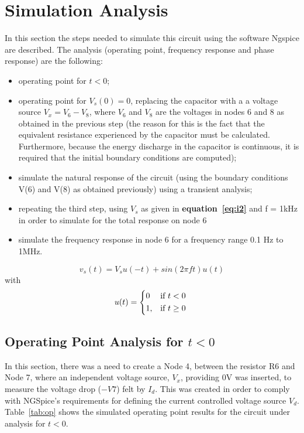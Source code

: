 \section{Simulation Analysis}
\label{sec:simulation}
In this section the steps needed to simulate this circuit using the software Ngspice are described. The analysis (operating point, frequency response and phase response) are the following:
\begin{itemize} 
	\item operating point for $t<0$;
	\item operating point for  $V_s(0) = 0$, replacing the capacitor with a a voltage source $V_x = V_6 - V_8$, where $V_6$ and $V_8$ are the voltages in nodes 6 and 8 as obtained in the previous step (the reason for this is the fact that the equivalent resistance experienced by the capacitor must be calculated. Furthermore, because the energy discharge in the capacitor is continuous, it is required that the initial boundary conditions are computed);
	\item simulate the natural response of the circuit (using the boundary conditions V(6) and V(8) as obtained previously) using a transient analysis;
	\item repeating the third step, using {\it $V_s$} as given in \textbf{equation~\ref{eq:i2}} and f = 1kHz  in order to simulate for the total response on node 6
	\item simulate the frequency response in node 6 for a frequency range 0.1 Hz to 1MHz.
\end{itemize}
\begin {equation}
	v_s( t)  = V_s u(-t) + sin( 2 \pi f t ) u( t)
	\label{eq:i1}
\end{equation}
 with 
\begin {equation}
	u( t ) =  
	\begin{cases*} 
	  0 & if $t < 0$ \\
	1, & if $t \geq 0$
	\end{cases*}
	\label{eq:i31}  
\end{equation}

\subsection{Operating Point Analysis for $t<0$}
In this section, there was a need to create a Node 4, between the resistor R6 and Node 7, where an independent voltage source, $V_x$, providing 0V was inserted, to measure the voltage drop ($-V7$) felt by $I_d$. This was created in order to comply with NGSpice's requirements for defining the current controlled voltage source $V_d$.
Table~\ref{tab:op} shows the simulated operating point results for the circuit
under analysis for $t<0$.

